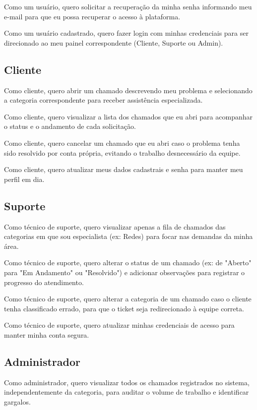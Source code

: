 \documentclass[a4paper, 12pt]{article}
\begin{document}
    Como um usuário, quero solicitar a recuperação da minha senha informando meu e-mail para que eu possa recuperar o acesso à plataforma.
    
    Como um usuário cadastrado, quero fazer login com minhas credenciais para ser direcionado ao meu painel correspondente (Cliente, Suporte ou Admin).

\subsection{Cliente}
    Como cliente, quero abrir um chamado descrevendo meu problema e selecionando a categoria correspondente para receber assistência especializada.

    Como cliente, quero visualizar a lista dos chamados que eu abri para acompanhar o status e o andamento de cada solicitação.

    Como cliente, quero cancelar um chamado que eu abri caso o problema tenha sido resolvido por conta própria, evitando o trabalho desnecessário da equipe.

    Como cliente, quero atualizar meus dados cadastrais e senha para manter meu perfil em dia.

\subsection{Suporte}
    Como técnico de suporte, quero visualizar apenas a fila de chamados das categorias em que sou especialista (ex: Redes) para focar nas demandas da minha área.

    Como técnico de suporte, quero alterar o status de um chamado (ex: de "Aberto" para "Em Andamento" ou "Resolvido") e adicionar observações para registrar o progresso do atendimento.

    Como técnico de suporte, quero alterar a categoria de um chamado caso o cliente tenha classificado errado, para que o ticket seja redirecionado à equipe correta.

    Como técnico de suporte, quero atualizar minhas credenciais de acesso para manter minha conta segura.

\subsection{Administrador}
    Como administrador, quero visualizar todos os chamados registrados no sistema, independentemente da categoria, para auditar o volume de trabalho e identificar gargalos.
\end{document}
